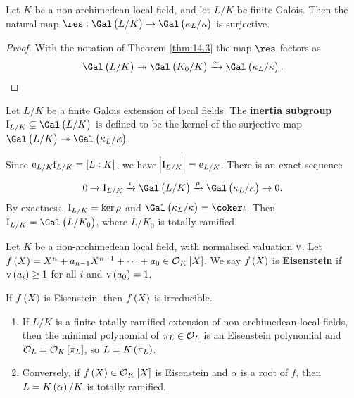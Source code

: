 \begin{corollary}
Let $ K $ be a non-archimedean local field, and let $ L / K $ be finite Galois. Then the natural map $ \res : \Gal\br{L / K} \to \Gal\br{\kappa_L / \kappa} $ is surjective.
\end{corollary}

\begin{proof}
With the notation of Theorem \ref{thm:14.3} the map $ \res $ factors as
$$ \Gal\br{L / K} \twoheadrightarrow \Gal\br{K_0 / K} \xrightarrow{\sim} \Gal\br{\kappa_L / \kappa}. $$
\end{proof}

\begin{definition}
Let $ L / K $ be a finite Galois extension of local fields. The \textbf{inertia subgroup} $ \I_{L / K} \subseteq \Gal\br{L / K} $ is defined to be the kernel of the surjective map $ \Gal\br{L / K} \twoheadrightarrow \Gal\br{\kappa_L / \kappa} $.
\end{definition}

Since $ \e_{L / K}\f_{L / K} = \sbr{L : K} $, we have $ \abs{\mathrm{I}_{L / K}} = \mathrm{e}_{L / K} $. There is an exact sequence
$$ 0 \to \I_{L / K} \xrightarrow{\iota} \Gal\br{L / K} \xrightarrow{\rho} \Gal\br{\kappa_L / \kappa} \to 0. $$
By exactness, $ \mathrm{I}_{L / K} = \ker \rho $ and $ \Gal\br{\kappa_L / \kappa} = \coker \iota $. Then $ \I_{L / K} = \Gal\br{L / K_0} $, where $ L / K_0 $ is totally ramified.

\begin{definition}
Let $ K $ be a non-archimedean local field, with normalised valuation $ \mathrm{v} $. Let $ f\br{X} = X^n + a_{n - 1}X^{n - 1} + \dots + a_0 \in \OOO_K\sbr{X} $. We say $ f\br{X} $ is \textbf{Eisenstein} if $ \v\br{a_i} \ge 1 $ for all $ i $ and $ \v\br{a_0} = 1 $.
\end{definition}

\begin{fact*}
If $ f\br{X} $ is Eisenstein, then $ f\br{X} $ is irreducible.
\end{fact*}

\begin{theorem}
\label{thm:14.8}
\hfill
\begin{enumerate}
\item If $ L / K $ is a finite totally ramified extension of non-archimedean local fields, then the minimal polynomial of $ \pi_L \in \mathcal{O}_L $ is an Eisenstein polynomial and $ \OOO_L = \OOO_K\sbr{\pi_L} $, so $ L = K\br{\pi_L} $.
\item Conversely, if $ f\br{X} \in \OOO_K\sbr{X} $ is Eisenstein and $ \alpha $ is a root of $ f $, then $ L = K\br{\alpha} / K $ is totally ramified.
\end{enumerate}
\end{theorem}

